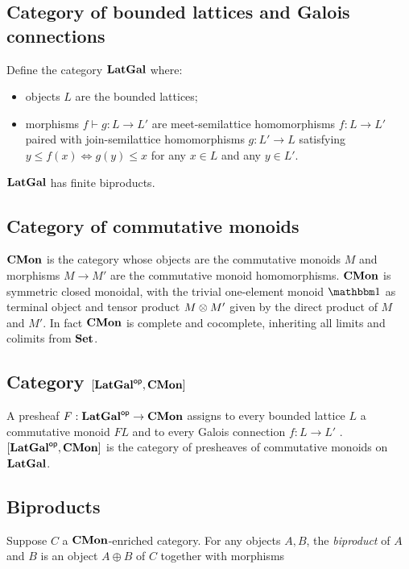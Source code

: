 
\subsection{Category of bounded lattices and Galois connections}

Define the category $\mathbf{LatGal}$ where:
\begin{itemize}
\item objects $L$ are the bounded lattices;
\item morphisms $f \vdash g: L \to L'$ are meet-semilattice homomorphisms $f: L \to L'$ paired with
join-semilattice homomorphisms $g: L' \to L$ satisfying $y \leq f(x) \iff g(y) \leq x$ for any $x \in L$ and any
$y \in L'$.
\end{itemize}

\noindent $\mathbf{LatGal}$ has finite biproducts. 

\subsection{Category of commutative monoids}

$\mathbf{CMon}$ is the category whose objects are the commutative monoids $M$ and morphisms $M \to M'$ are the
commutative monoid homomorphisms. $\mathbf{CMon}$ is symmetric closed monoidal, with the trivial one-element monoid
$\One$ as terminal object and tensor product $M \otimes M'$ given by the direct product of $M$ and $M'$. In
fact $\mathbf{CMon}$ is complete and cocomplete, inheriting all limits and colimits from $\mathbf{Set}$.

\subsection{Category $[\mathbf{LatGal}^{\mathsf{op}},\mathbf{CMon}]$}

A presheaf $F: \mathbf{LatGal}^{\mathsf{op}} \to \mathbf{CMon}$ assigns to every
bounded lattice $L$ a commutative monoid $FL$ and to every Galois connection $f: L \to L'$ .
$[\mathbf{LatGal}^{\mathsf{op}},\mathbf{CMon}]$ is the category of presheaves of commutative monoids on $\mathbf{LatGal}$.

\subsection{Biproducts}

Suppose $C$ a $\mathbf{CMon}$-enriched category. For any objects $A, B$, the \emph{biproduct} of $A$ and $B$ is an
object $A \oplus B$ of $C$ together with morphisms

